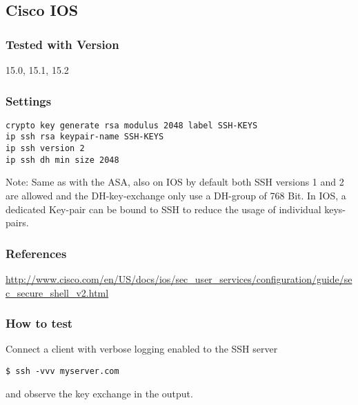 \subsection{Cisco IOS}
\subsubsection{Tested with Version} 15.0, 15.1, 15.2
\subsubsection{Settings}
\begin{lstlisting}[breaklines]
crypto key generate rsa modulus 2048 label SSH-KEYS
ip ssh rsa keypair-name SSH-KEYS
ip ssh version 2
ip ssh dh min size 2048
\end{lstlisting}
Note: Same as with the ASA, also on IOS by default both SSH versions 1 and 2 are allowed and the DH-key-exchange only use a DH-group of 768 Bit.
In IOS, a dedicated Key-pair can be bound to SSH to reduce the usage of individual keys-pairs.
\subsubsection{References}
\url{http://www.cisco.com/en/US/docs/ios/sec\_user\_services/configuration/guide/sec\_secure\_shell\_v2.html }
\subsubsection{How to test}
Connect a client with verbose logging enabled to the SSH server \\
\begin{lstlisting}[breaklines]
$ ssh -vvv myserver.com
\end{lstlisting}and observe the key exchange in the output.
